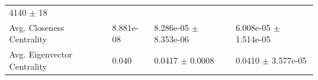 \documentclass[12pt,twoside]{amherstthesis}
\begin{document}
\begin{longtable}[]{@{}llll@{}}
\begin{minipage}[t]{0.26\columnwidth}
  4140 \(\pm\) 18\strut
  \end{minipage}\tabularnewline
  \begin{minipage}[t]{0.28\columnwidth}\raggedright\strut
  Avg. Closeness Centrality\strut
  \end{minipage} & \begin{minipage}[t]{0.11\columnwidth}\raggedright\strut
  8.881e-08\strut
  \end{minipage} & \begin{minipage}[t]{0.24\columnwidth}\raggedright\strut
  8.286e-05 \(\pm\) 8.353e-06\strut
  \end{minipage} & \begin{minipage}[t]{0.26\columnwidth}\raggedright\strut
  6.008e-05 \(\pm\) 1.514e-05\strut
  \end{minipage}\tabularnewline
  \begin{minipage}[t]{0.28\columnwidth}\raggedright\strut
  Avg. Eigenvector Centrality\strut
  \end{minipage} & \begin{minipage}[t]{0.11\columnwidth}\raggedright\strut
  0.040\strut
  \end{minipage} & \begin{minipage}[t]{0.24\columnwidth}\raggedright\strut
  0.0417 \(\pm\) 0.0008\strut
  \end{minipage} & \begin{minipage}[t]{0.26\columnwidth}\raggedright\strut
  0.0410 \(\pm\) 3.577e-05\strut
  \end{minipage}\tabularnewline
  \bottomrule
  \end{longtable}
  
\end{document}
